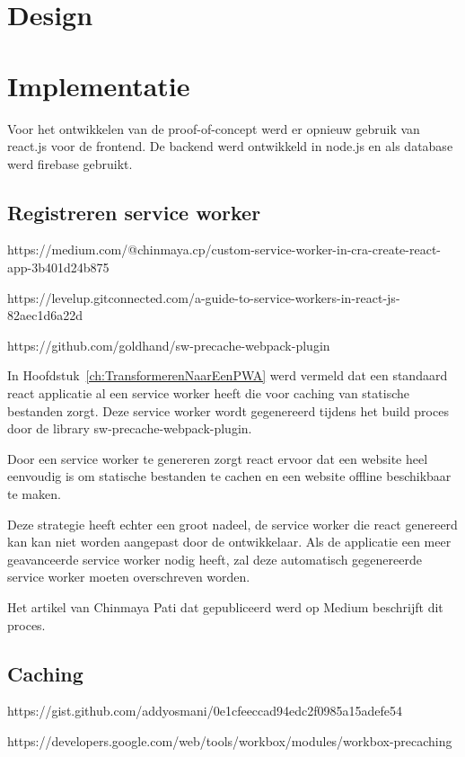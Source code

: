 		
\section{Design} 

\section{Implementatie}
	
	Voor het ontwikkelen van de proof-of-concept werd er opnieuw gebruik van react.js voor de frontend. De backend werd ontwikkeld in node.js en als database werd firebase gebruikt.
	
	\subsection{Registreren service worker}
		https://medium.com/@chinmaya.cp/custom-service-worker-in-cra-create-react-app-3b401d24b875
		
		https://levelup.gitconnected.com/a-guide-to-service-workers-in-react-js-82aec1d6a22d
		
		https://github.com/goldhand/sw-precache-webpack-plugin
		
		In Hoofdstuk~\ref{ch:TransformerenNaarEenPWA} werd vermeld dat een standaard react applicatie al een service worker heeft die voor caching van statische bestanden zorgt. Deze service worker wordt gegenereerd tijdens het build proces door de library sw-precache-webpack-plugin. 
		
		Door een service worker te genereren zorgt react ervoor dat een website heel eenvoudig is om statische bestanden te cachen en een website offline beschikbaar te maken.
		
		Deze strategie heeft echter een groot nadeel, de service worker die react genereerd kan kan niet worden aangepast door de ontwikkelaar. Als de applicatie een meer geavanceerde service worker nodig heeft, zal deze automatisch gegenereerde service worker moeten overschreven worden.
		
		Het artikel van Chinmaya Pati dat gepubliceerd werd op Medium beschrijft dit proces.
		
	\subsection{Caching}
	https://gist.github.com/addyosmani/0e1cfeeccad94edc2f0985a15adefe54
	
	https://developers.google.com/web/tools/workbox/modules/workbox-precaching
	
